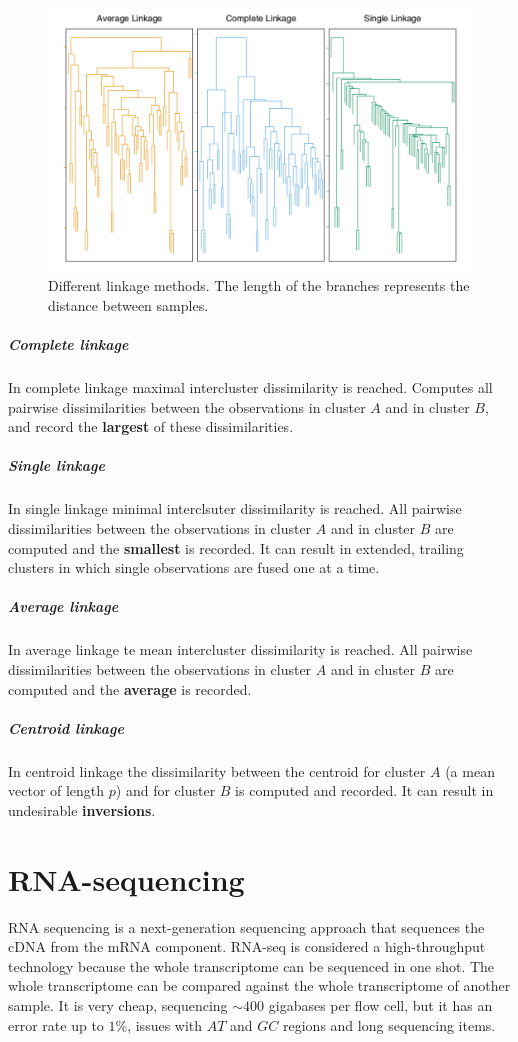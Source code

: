 			\begin{figure}
	\centering
	\includegraphics[scale=0.2]{linkage}
	\caption{Different linkage methods. The length of the branches represents the distance between samples.}
	\label{fig:linkage}
\end{figure}

				\subparagraph{Complete linkage}
				In complete linkage maximal intercluster dissimilarity is reached.
				Computes all pairwise dissimilarities between the observations in cluster $A$ and in cluster $B$, and record the \textbf{largest} of these dissimilarities.

				\subparagraph{Single linkage}
				In single linkage minimal interclsuter dissimilarity is reached.
				All pairwise dissimilarities between the observations in cluster $A$ and in cluster $B$ are computed and the \textbf{smallest} is recorded.
				It can result in extended, trailing clusters in which single observations are fused one at a time.

				\subparagraph{Average linkage}
				In average linkage te mean intercluster dissimilarity  is reached.
				All pairwise dissimilarities between the observations in cluster $A$ and in cluster $B$ are computed and the \textbf{average} is recorded.

				\subparagraph{Centroid linkage}
				In centroid linkage the dissimilarity between the centroid for cluster $A$ (a mean vector of length $p$) and for cluster $B$ is computed and recorded.
				It can result in undesirable \textbf{inversions}.


\section{RNA-sequencing}
	RNA sequencing is a next-generation sequencing approach that sequences the cDNA from the mRNA component.
	RNA-seq is considered a high-throughput technology because the whole transcriptome can be sequenced in one shot.
	The whole transcriptome can be compared against the whole transcriptome of another sample.
	It is very cheap, sequencing $\sim 400$ gigabases per flow cell, but it has an error rate up to $1\%$, issues with $AT$ and $GC$ regions and long sequencing items.

